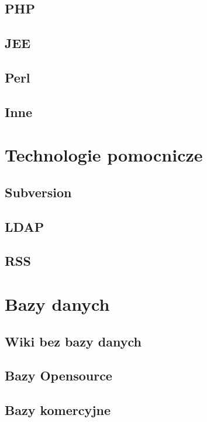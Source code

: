\documentclass{article}
\begin{document}
	\subsection{PHP} 
	\subsection{JEE}
	\subsection{Perl}
	\subsection{Inne}

\section{Technologie pomocnicze}
	\subsection{Subversion}
	\subsection{LDAP}
	\subsection{RSS}

\section{Bazy danych}
	\subsection{Wiki bez bazy danych}
	\subsection{Bazy Opensource}
	\subsection{Bazy komercyjne}
\end{document}
